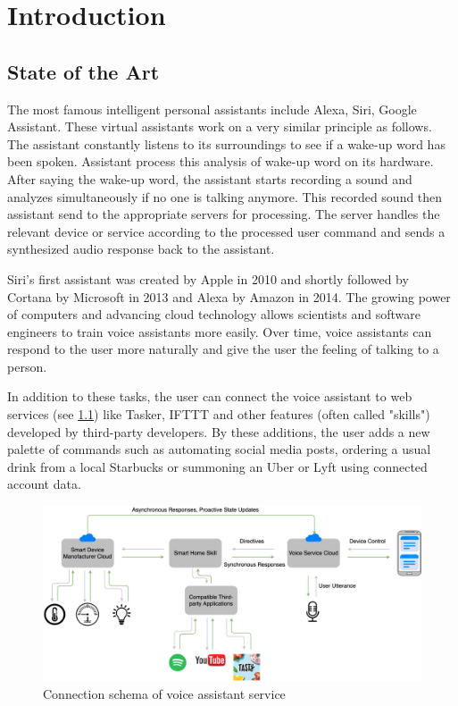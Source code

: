 \chapter{Introduction} \label{chap:introduction}


\section{State of the Art} \label{sec:state_of_the_art}


The most famous intelligent personal assistants include Alexa, Siri, Google Assistant. These virtual assistants work on a very similar principle as follows. The assistant constantly listens to its surroundings to see if a wake-up word has been spoken. Assistant process this analysis of wake-up word on its hardware. After saying the wake-up word, the assistant starts recording a sound and analyzes simultaneously if no one is talking anymore. This recorded sound then assistant send to the appropriate servers for processing. The server handles the relevant device or service according to the processed user command and sends a synthesized audio response back to the assistant.

Siri's first assistant was created by Apple in 2010 and shortly followed by Cortana by Microsoft in 2013 and Alexa by Amazon in 2014. The growing power of computers and advancing cloud technology allows scientists and software engineers to train voice assistants more easily. Over time, voice assistants can respond to the user more naturally and give the user the feeling of talking to a person. 

In addition to these tasks, the user can connect the voice assistant to web services (see \cref{fig:voice_assistant_connecrtion_schema}) like Tasker, IFTTT and other features (often called "skills") developed by third-party developers. By these additions, the user adds a new palette of commands such as automating social media posts, ordering a usual drink from a local Starbucks or summoning an Uber or Lyft using connected account data.

\begin{figure}[H]
    \centering
    \includegraphics[width=\textwidth]{img/voice_assistant_to_server_connection.png}
    \caption{Connection schema of voice assistant service}
    \label{fig:voice_assistant_connecrtion_schema}
\end{figure}

